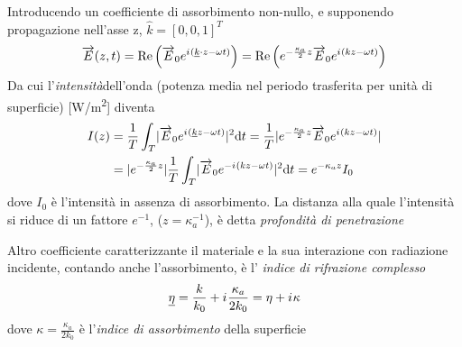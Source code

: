 Introducendo un coefficiente di assorbimento non-nullo, e supponendo propagazione nell'asse z, $\hat{k} = [0, 0, 1]^T$
\[\overrightarrow{E}(z, t) = \Re\left( \overrightarrow{E}_0 e^{{i\mkern1mu} (\underline{k}\cdot z-\omega t)} \right) = 
	\Re\left( e^{-\frac{\kappa_a}{2}z} \overrightarrow{E}_0 e^{{i\mkern1mu} ( kz-\omega t )}\right)\]
Da cui l'\textit{intensit\`a}\footnotemark dell'onda (potenza media nel periodo trasferita per unit\`a di superficie) [\si{W/m^2}] 
diventa \cite{pegoraro}
\begin{align}
	I(z) &= \frac{1}{T} \int_T \lvert \overrightarrow{E}_0 e^{{i\mkern1mu} (\underline{k}z-\omega t)} \rvert^2 \mathrm{d}t = 
	\frac{1}{T} \lvert e^{-\frac{\kappa_a}{2}z} \overrightarrow{E}_0 e^{{i\mkern1mu} ( kz-\omega t )} \rvert \\ 
	&= \lvert e^{-\frac{\kappa_a}{2}z} \rvert \frac{1}{T} \int_T \lvert \overrightarrow{E}_0 e^{-{i\mkern1mu} (kz-\omega t)} \rvert^2 \mathrm{d}t = 
	e^{-\kappa_az} I_0
\end{align}
dove $I_0$ \`e l'intensit\`a in assenza di assorbimento. La distanza alla quale l'intensit\`a si riduce di un fattore $e^{-1}$, ($z=\kappa_a^{-1}$),
\`e detta \textit{profondit\`a di penetrazione}\par
Altro coefficiente caratterizzante il materiale e la sua interazione con radiazione incidente, contando anche l'assorbimento, \`e l'
\textit{indice di rifrazione complesso}
\[\underline{\eta} = \frac{k}{k_0} + {i\mkern1mu} \frac{\kappa_a}{2k_0} = \eta + {i\mkern1mu}\kappa\]
dove $\kappa = \frac{\kappa_a}{2k_0}$ \`e l'\textit{indice di assorbimento} della superficie
